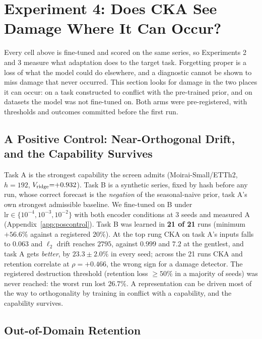 \section{Experiment 4: Does CKA See Damage Where It Can Occur?}
\label{sec:exp4}

Every cell above is fine-tuned and scored on the same series, so Experiments 2
and 3 measure what adaptation does to the target task.  Forgetting proper is a loss
of what the model could do elsewhere, and a diagnostic cannot be shown to miss
damage that never occurred.  This section looks for damage in the two places it
can occur: on a task constructed to conflict with the pre-trained prior, and on
datasets the model was not fine-tuned on.  Both arms were pre-registered, with
thresholds and outcomes committed before the first run.

\subsection{A Positive Control: Near-Orthogonal Drift, and the Capability Survives}
\label{sec:exp4:poscontrol}

Task A is the strongest capability the screen admits (Moirai-Small/ETTh2,
$h{=}192$, $V_{\text{ridge}}{=}{+}0.932$).  Task B is a synthetic series, fixed
by hash before any run, whose correct forecast is the \emph{negation} of the
seasonal-naive prior, task A's own strongest admissible baseline.  We fine-tuned
on B under $\text{lr}\in\{10^{-4},10^{-3},10^{-2}\}$ with both encoder conditions
at 3 seeds and measured A (Appendix~\ref{app:poscontrol}).  Task B was learned in
\textbf{21 of 21} runs (minimum $+56.6\%$ against a registered $20\%$).  At the top
rung CKA on task A's inputs falls to $0.063$ and $\ell_2$ drift reaches $2795$,
against $0.999$ and $7.2$ at the gentlest, and task A gets \emph{better}, by
$23.3{\pm}2.0\%$ in every seed; across the 21 runs CKA and retention correlate at
$\rho{=}{+}0.466$, the wrong sign for a damage detector.  The registered
destruction threshold (retention loss ${\geq}50\%$ in a majority of seeds) was
never reached: the worst run lost $26.7\%$.  A representation can be driven most
of the way to orthogonality by training in conflict with a capability, and the
capability survives.

\subsection{Out-of-Domain Retention}
\label{sec:exp4:ood}

